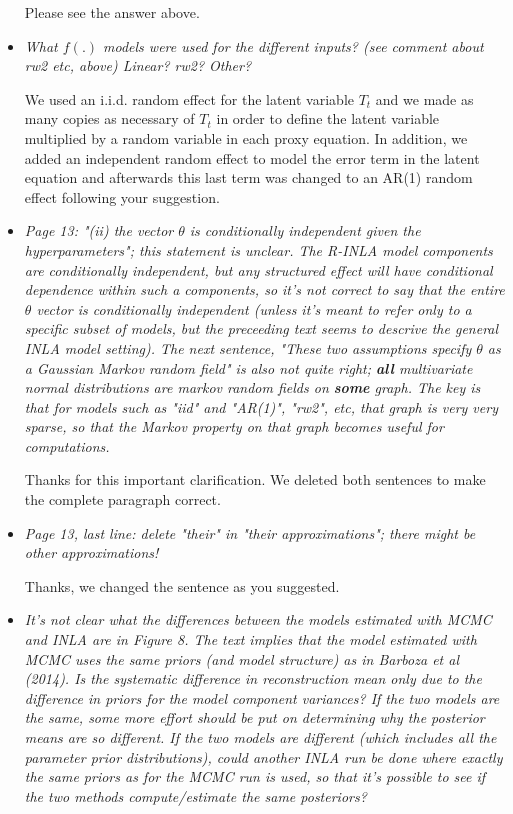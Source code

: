 \documentclass[11pt]{article}
\begin{document}
\begin{itemize}
Please see the answer above.

\item \textit{What $f(.)$ models were used for the different inputs? (see comment
  about rw2 etc, above) Linear? rw2? Other?}

We used an i.i.d. random effect for the latent variable $T_t$ and we made as
many copies as necessary of $T_t$ in order to define the latent variable
multiplied by a random variable in each proxy equation. In addition, we added an
independent random effect to model the error term in the latent equation and
afterwards this
last term was changed to an AR(1) random effect following your suggestion.  

\item \textit{Page 13: "(ii) the vector $\theta$ is conditionally independent given
  the hyperparameters"; this statement is unclear. The R-INLA model
  components are conditionally independent, but any structured effect
  will have conditional dependence within such a components, so it's
  not correct to say that the entire $\theta$ vector is conditionally
  independent (unless it's meant to refer only to a specific subset of
  models, but the preceeding text seems to descrive the general INLA
  model setting). The next sentence, "These two assumptions specify $\theta$ as a
  Gaussian Markov random field" is also not quite right; \textbf{all}
  multivariate normal distributions are markov random fields on \textbf{some}
  graph. The key is that for models such as "iid" and "AR(1)", "rw2",
  etc, that graph is very very sparse, so that the Markov property on
  that graph becomes useful for computations.} 

Thanks for this important clarification. We deleted both sentences to make the complete
paragraph correct. 


\item \textit{Page 13, last line: delete "their" in "their approximations"; there
  might be other approximations!}
  
Thanks, we changed the sentence as you suggested.

\item \textit{It's not clear what the differences between the models estimated
  with MCMC and INLA are in Figure 8. The text implies that the model
  estimated with MCMC uses the same priors (and model structure) as in
  Barboza et al (2014). Is the systematic difference in reconstruction
  mean only due to the difference in priors for the model component
  variances?  If the two models are the same, some more effort should
  be put on determining why the posterior means are so different. If
  the two models are different (which includes all the parameter prior
  distributions), could another INLA run be done where exactly the
  same priors as for the MCMC run is used, so that it's possible to
  see if the two methods compute/estimate the same posteriors?}


\end{itemize}
\end{document}
